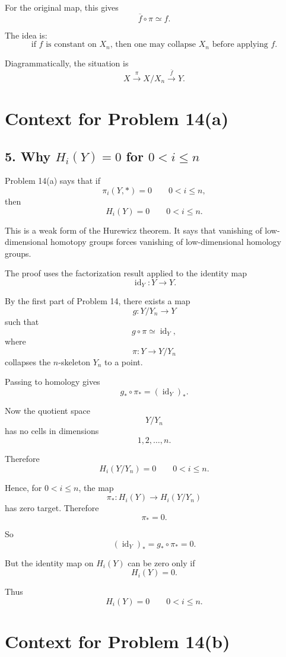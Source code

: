 \documentclass[12pt,a4paper]{article}
\theoremstyle{notespace}
\begin{document}
For the original map, this gives
\[
\overline f\circ \pi\simeq f.
\]

The idea is:
\[
\text{if \(f\) is constant on \(X_n\), then one may collapse \(X_n\) before applying \(f\).}
\]

Diagrammatically, the situation is
\[
X
\xrightarrow{\pi}
X/X_n
\xrightarrow{\overline f}
Y.
\]

\section*{Context for Problem 14(a)}

\subsection*{5. Why \(H_i(Y)=0\) for \(0<i\leq n\)}

Problem 14(a) says that if
\[
\pi_i(Y,*)=0
\qquad
0<i\leq n,
\]
then
\[
H_i(Y)=0
\qquad
0<i\leq n.
\]

This is a weak form of the Hurewicz theorem. It says that vanishing of low-dimensional homotopy groups forces vanishing of low-dimensional homology groups.

The proof uses the factorization result applied to the identity map
\[
\operatorname{id}_Y:Y\to Y.
\]

By the first part of Problem 14, there exists a map
\[
g:Y/Y_n\to Y
\]
such that
\[
g\circ \pi\simeq \operatorname{id}_Y,
\]
where
\[
\pi:Y\to Y/Y_n
\]
collapses the \(n\)-skeleton \(Y_n\) to a point.

Passing to homology gives
\[
g_*\circ \pi_*=(\operatorname{id}_Y)_*.
\]

Now the quotient space
\[
Y/Y_n
\]
has no cells in dimensions
\[
1,2,\ldots,n.
\]

Therefore
\[
H_i(Y/Y_n)=0
\qquad
0<i\leq n.
\]

Hence, for \(0<i\leq n\), the map
\[
\pi_*:H_i(Y)\to H_i(Y/Y_n)
\]
has zero target. Therefore
\[
\pi_*=0.
\]

So
\[
(\operatorname{id}_Y)_*
=
g_*\circ \pi_*
=
0.
\]

But the identity map on \(H_i(Y)\) can be zero only if
\[
H_i(Y)=0.
\]

Thus
\[
\boxed{
	H_i(Y)=0
	\qquad
	0<i\leq n.
}
\]

\section*{Context for Problem 14(b)}
\end{document}

